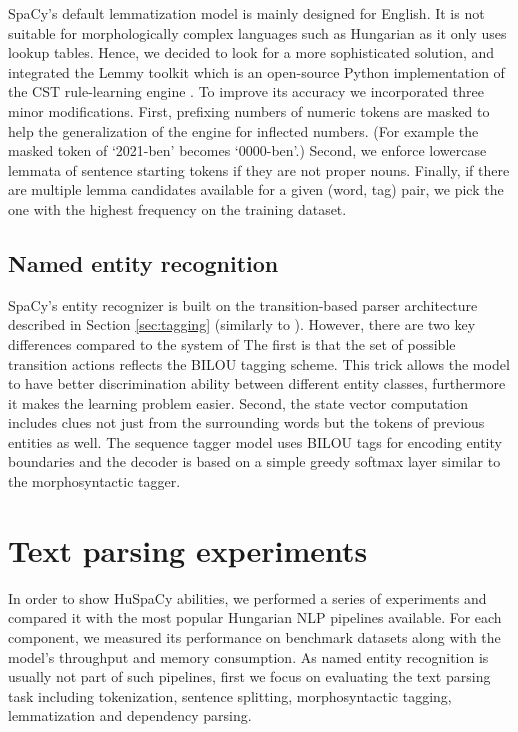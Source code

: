 \documentclass{llncs}
\newcommand{\huspacy}{HuSpaCy}
\newcommand{\lemmy}{Lemmy}
\begin{document}
SpaCy’s default lemmatization model is mainly designed for English. It is not suitable for morphologically complex languages such as Hungarian as it only uses lookup tables. Hence, we decided to look for a more sophisticated solution, and integrated the \lemmy{} toolkit \citep{lemmy} which is an open-source Python implementation of the CST rule-learning engine \citep{cst-lemmatizer}. To improve its accuracy we incorporated three minor modifications. First, prefixing numbers of numeric tokens are masked to help the generalization of the engine for inflected numbers. (For example the masked token of `2021-ben’ becomes `0000-ben’.) Second, we enforce lowercase lemmata of sentence starting tokens if they are not proper nouns. Finally, if there are multiple lemma candidates available for a given (word, tag) pair, we pick the one with the highest frequency on the training dataset.

\subsection{Named entity recognition}

SpaCy’s entity recognizer is built on the transition-based parser architecture described in Section \ref{sec:tagging} (similarly to \citet{spacy-ner}). However, there are two key differences compared to the system of \citet{spacy-ner} The first is that the set of possible transition actions reflects the BILOU tagging scheme. This trick allows the model to have better discrimination ability between different entity classes, furthermore it makes the learning problem easier. Second, the state vector computation includes clues not just from the surrounding words but the tokens of previous entities as well. The sequence tagger model uses BILOU tags for encoding entity boundaries and the decoder is based on a simple greedy softmax layer similar to the morphosyntactic tagger.

\section{Text parsing experiments}

In order to show \huspacy{} abilities, we performed a series of experiments and compared it with the most popular Hungarian NLP pipelines available. For each component, we measured its performance on benchmark datasets along with the model’s throughput and memory consumption. As named entity recognition is usually not part of such pipelines, first we focus on evaluating the text parsing task including tokenization, sentence splitting, morphosyntactic tagging, lemmatization and dependency parsing. 
\end{document}
